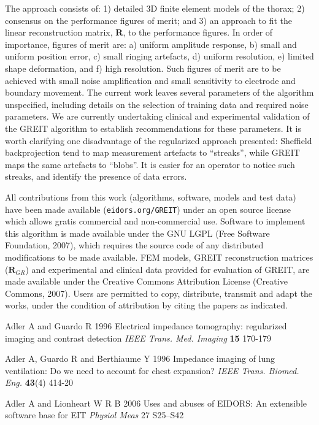 \documentclass[12pt]{iopart}
\newcommand{\RB}{\mbox{$\mathbf{R}$}}
\begin{document}
The approach consists of:
1) detailed 3D finite element models of the thorax;
2) consensus on the performance figures of merit;
and
3) an approach to fit the linear reconstruction
 matrix, $\RB$, to the performance figures.
In order of importance, figures of merit are:
a) uniform amplitude response,
b) small and uniform position error,
c) small ringing artefacts,
d) uniform resolution,
e) limited shape deformation, and
f) high resolution.
Such figures of merit are to be achieved with
small noise amplification and
small sensitivity to electrode and boundary movement.
The current work leaves several parameters of the algorithm
unspecified, including details on the selection of training
data and required noise parameters. We are currently undertaking
clinical and experimental validation of the GREIT algorithm
to establish recommendations for these parameters.
It is worth clarifying one disadvantage of the regularized
approach presented: Sheffield backprojection tend to map
measurement artefacts to ``streaks'', while GREIT maps the same
artefacts to ``blobs''. It is easier for an operator to notice
such streaks, and identify the presence of data errors.

All contributions from this work
(algorithms, software, models and test data)
 have been made available (\verb+eidors.org/GREIT+) 
under an open source license which allows
gratis commercial and non-commercial use.
Software to implement this algorithm is made
available under the GNU LGPL (Free Software Foundation, 2007),
which requires the source code of any distributed
 modifications to be made available.
FEM models, GREIT reconstruction matrices ($\RB_{GR}$) and
experimental and clinical data provided for evaluation of GREIT,
are made available under the Creative Commons Attribution
License (Creative Commons, 2007). Users are permitted
to copy, distribute, transmit and adapt the works,
under the condition of attribution by citing the
papers as indicated.



\References %
\item[]
Adler A and Guardo R 1996 Electrical impedance tomography:
regularized imaging and contrast detection {\em IEEE Trans. Med.
Imaging} {\bf 15} 170-179

\item[]
Adler A, Guardo R and Berthiaume Y 1996 Impedance imaging of lung
ventilation: Do we need to account for chest expansion? {\em IEEE
Trans. Biomed. Eng.} {\bf 43}(4) 414-20


\item[]
Adler A and Lionheart W R B 2006
Uses and abuses of EIDORS: An extensible software base for EIT
{\em Physiol Meas}
27 S25--S42
\end{document}
